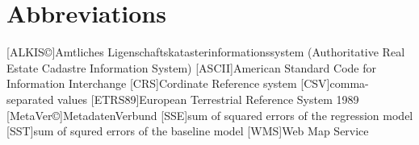 \documentclass[a4paper, 11pt, oneside]{Thesis}  %
\begin{document}

\clearpage  %





\pagestyle{fancy}  %


\tableofcontents  %

\listoffigures  %


\clearpage  %
\chapter{Abbreviations}


\begin{acronym}
[ALKIS\copyright]{Amtliches Ligenschaftskatasterinformationssystem (Authoritative Real Estate Cadastre Information System)}
[ASCII]{American Standard Code for Information Interchange}
[CRS]{Cordinate Reference system}
[CSV]{comma-separated values}
[ETRS89]{European Terrestrial Reference System 1989}
[MetaVer\copyright]{MetadatenVerbund}
[SSE]{sum of squared errors of the regression model}
[SST]{sum of squred errors of the baseline model}
[WMS]{Web Map Service}

\end{acronym}
\end{document}
